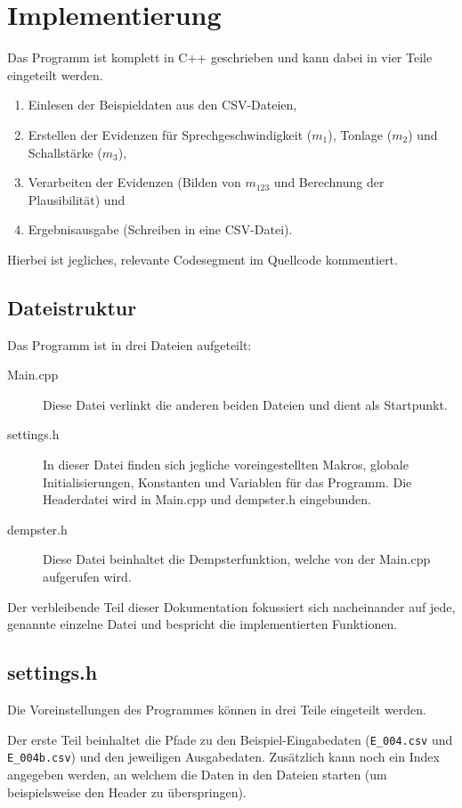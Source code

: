 \chapter{Implementierung}
Das Programm ist komplett in C++ geschrieben und kann dabei in vier Teile eingeteilt werden.

\begin{enumerate}
  \item Einlesen der Beispieldaten aus den CSV-Dateien,
  \item Erstellen der Evidenzen für Sprechgeschwindigkeit (\(m_1\)), Tonlage (\(m_2\)) und Schallstärke (\(m_3\)),
  \item Verarbeiten der Evidenzen (Bilden von \(m_{123}\) und Berechnung der Plausibilität) und
  \item Ergebnisausgabe (Schreiben in eine CSV-Datei).
\end{enumerate}

Hierbei ist jegliches, relevante Codesegment im Quellcode kommentiert.

\section{Dateistruktur}
Das Programm ist in drei Dateien aufgeteilt:

\begin{description}
  \item [Main.cpp] Diese Datei verlinkt die anderen beiden Dateien und dient als Startpunkt. 
  \item [settings.h] In dieser Datei finden sich jegliche voreingestellten Makros, globale Initialisierungen, Konstanten und Variablen für das Programm. Die Headerdatei wird in Main.cpp und dempster.h eingebunden.
  \item [dempster.h] Diese Datei beinhaltet die Dempsterfunktion, welche von der Main.cpp aufgerufen wird.
  \end{description}

 Der verbleibende Teil dieser Dokumentation fokussiert sich nacheinander auf jede, genannte einzelne Datei und bespricht die implementierten Funktionen.

\section{settings.h}
Die Voreinstellungen des Programmes können in drei Teile eingeteilt werden.

Der erste Teil beinhaltet die Pfade zu den Beispiel-Eingabedaten (\verb|E_004.csv| und \verb|E_004b.csv|) und den jeweiligen Ausgabedaten. Zusätzlich kann noch ein Index angegeben werden, an welchem die Daten in den Dateien starten (um beispielsweise den Header zu überspringen).

